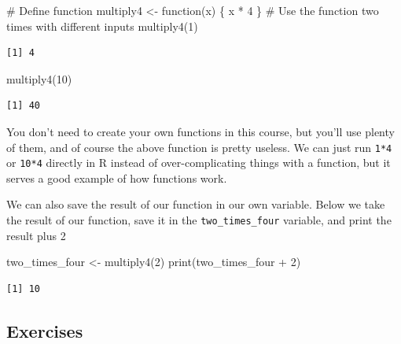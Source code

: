 \documentclass[
  letterpaper,
  DIV=11,
  numbers=noendperiod]{scrreprt}
\newenvironment{Shaded}{\begin{snugshade}}{\end{snugshade}}
\newcommand{\CommentTok}[1]{\textcolor[rgb]{0.37,0.37,0.37}{#1}}
\newcommand{\ControlFlowTok}[1]{\textcolor[rgb]{0.00,0.23,0.31}{#1}}
\newcommand{\DecValTok}[1]{\textcolor[rgb]{0.68,0.00,0.00}{#1}}
\newcommand{\FunctionTok}[1]{\textcolor[rgb]{0.28,0.35,0.67}{#1}}
\newcommand{\NormalTok}[1]{\textcolor[rgb]{0.00,0.23,0.31}{#1}}
\newcommand{\OtherTok}[1]{\textcolor[rgb]{0.00,0.23,0.31}{#1}}
\newcommand{\SpecialCharTok}[1]{\textcolor[rgb]{0.37,0.37,0.37}{#1}}
\begin{document}
\begin{Shaded}
\begin{Highlighting}[]
\CommentTok{\# Define function}
\NormalTok{multiply4 }\OtherTok{\textless{}{-}} \ControlFlowTok{function}\NormalTok{(x) \{}
\NormalTok{  x }\SpecialCharTok{*} \DecValTok{4}
\NormalTok{\}}
\CommentTok{\# Use the function two times with different inputs}
\FunctionTok{multiply4}\NormalTok{(}\DecValTok{1}\NormalTok{)}
\end{Highlighting}
\end{Shaded}

\begin{verbatim}
[1] 4
\end{verbatim}

\begin{Shaded}
\begin{Highlighting}[]
\FunctionTok{multiply4}\NormalTok{(}\DecValTok{10}\NormalTok{)}
\end{Highlighting}
\end{Shaded}

\begin{verbatim}
[1] 40
\end{verbatim}

You don't need to create your own functions in this course, but you'll
use plenty of them, and of course the above function is pretty useless.
We can just run \texttt{1*4} or \texttt{10*4} directly in R instead of
over-complicating things with a function, but it serves a good example
of how functions work.

We can also save the result of our function in our own variable. Below
we take the result of our function, save it in the
\texttt{two\_times\_four} variable, and print the result plus 2

\begin{Shaded}
\begin{Highlighting}[]
\NormalTok{two\_times\_four }\OtherTok{\textless{}{-}} \FunctionTok{multiply4}\NormalTok{(}\DecValTok{2}\NormalTok{)}
\FunctionTok{print}\NormalTok{(two\_times\_four }\SpecialCharTok{+} \DecValTok{2}\NormalTok{)}
\end{Highlighting}
\end{Shaded}

\begin{verbatim}
[1] 10
\end{verbatim}

\subsection{Exercises}\label{exercises-2}
\end{document}
